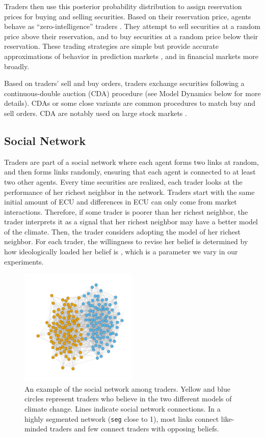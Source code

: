 \documentclass{wscpaperproc}\usepackage[]{graphicx}\usepackage[]{color}
\begin{document}
Traders then use this posterior probability distribution to assign reservation prices for buying and selling securities.
Based on their reservation price, agents behave as ``zero-intelligence'' traders .
They attempt to sell securities at a random price above their reservation, and to buy securities at a random price below their reservation.
These trading strategies are simple but provide accurate approximations of behavior in prediction markets , and in financial markets more broadly.

Based on traders' sell and buy orders, traders exchange securities following a continuous-double auction (CDA) procedure (see Model Dynamics below for more details).
CDAs or some close variants are common procedures to match buy and sell orders.
CDA are notably used on large stock markets .

\subsection{Social Network}

Traders are part of a social network where each agent forms two links at random, and then forms links randomly, ensuring that each agent is connected to at least two other agents.
Every time securities are realized, each trader looks at the performance of her richest neighbor in the network.
Traders start with the same initial amount of ECU and differences in ECU can only come from market interactions.
Therefore, if some trader is poorer than her richest neighbor, the trader interprets it as a signal that her richest neighbor may have a better model of the climate.
Then, the trader considers adopting the model of her richest neighbor.
For each trader, the willingness to revise her belief is determined by how ideologically loaded her belief is , which is a parameter we vary in our experiments.

\begin{figure}[t]
\begin{center}
\includegraphics[width=0.50\textwidth]{output/network.pdf}
\caption{An example of the social network among traders. Yellow and blue circles represent traders who believe in the two different models of climate change. Lines indicate social network connections. In a highly segmented network (\texttt{seg} close to 1), most links connect like-minded traders and few connect traders with opposing beliefs.}\label{fig:social_network}%
\end{center}
\end{figure}
\end{document}
